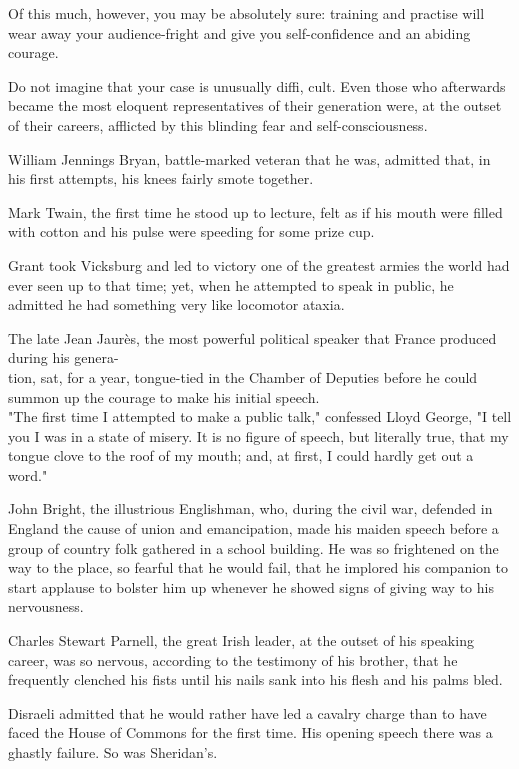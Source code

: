 \documentclass[10pt]{article}
\begin{document}
Of this much, however, you may be absolutely sure: training and practise will wear away your audience-fright and give you self-confidence and an abiding courage.

Do not imagine that your case is unusually diffi, cult. Even those who afterwards became the most eloquent representatives of their generation were, at the outset of their careers, afflicted by this blinding fear and self-consciousness.

William Jennings Bryan, battle-marked veteran that he was, admitted that, in his first attempts, his knees fairly smote together.

Mark Twain, the first time he stood up to lecture, felt as if his mouth were filled with cotton and his pulse were speeding for some prize cup.

Grant took Vicksburg and led to victory one of the greatest armies the world had ever seen up to that time; yet, when he attempted to speak in public, he admitted he had something very like locomotor ataxia.

The late Jean Jaurès, the most powerful political speaker that France produced during his genera-\\
tion, sat, for a year, tongue-tied in the Chamber of Deputies before he could summon up the courage to make his initial speech.\\
"The first time I attempted to make a public talk," confessed Lloyd George, "I tell you I was in a state of misery. It is no figure of speech, but literally true, that my tongue clove to the roof of my mouth; and, at first, I could hardly get out a word."

John Bright, the illustrious Englishman, who, during the civil war, defended in England the cause of union and emancipation, made his maiden speech before a group of country folk gathered in a school building. He was so frightened on the way to the place, so fearful that he would fail, that he implored his companion to start applause to bolster him up whenever he showed signs of giving way to his nervousness.

Charles Stewart Parnell, the great Irish leader, at the outset of his speaking career, was so nervous, according to the testimony of his brother, that he frequently clenched his fists until his nails sank into his flesh and his palms bled.

Disraeli admitted that he would rather have led a cavalry charge than to have faced the House of Commons for the first time. His opening speech there was a ghastly failure. So was Sheridan's.
\end{document}
